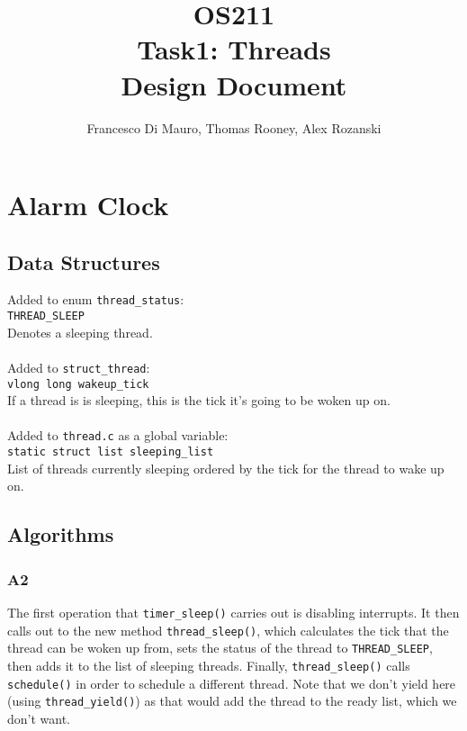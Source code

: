 \documentclass[a4wide, 11pt]{article}
\newcommand{\tab}{\hspace*{2em}}
\begin{document}
\title{OS211 \\ Task1: Threads \\ Design Document}
\author{Francesco Di Mauro, Thomas Rooney, Alex Rozanski}
\maketitle


\section{Alarm Clock}
\subsection{Data Structures}

Added to enum \texttt{thread\_status}: \\
\tab \tab \texttt{THREAD\_SLEEP} \\
\tab \tab Denotes a sleeping thread.
\\\\
Added to \texttt{struct\_thread}: \\
\tab\tab \texttt{vlong long wakeup\_tick} \\
\tab\tab If a thread is is sleeping, this is the tick it's going to be woken up on.
\\\\
Added to \texttt{thread.c} as a global variable: \\
\tab\tab \texttt{static struct list sleeping\_list} \\
\tab\tab List of threads currently sleeping ordered by the tick for the thread to wake up on.

\subsection{Algorithms}
\subsubsection{A2}
The first operation that \texttt{timer\_sleep()} carries out is disabling interrupts. It then calls out to the new method \texttt{thread\_sleep()}, which calculates the tick that the thread can be woken up from, sets the status of the thread to \texttt{THREAD\_SLEEP}, then adds it to the list of sleeping threads. Finally, \texttt{thread\_sleep()} calls \texttt{schedule()} in order to schedule a different thread. Note that we don't yield here (using \texttt{thread\_yield()}) as that would add the thread to the ready list, which we don't want.
\end{document}
